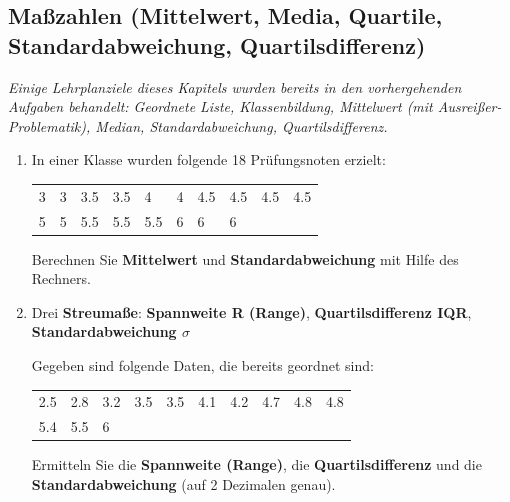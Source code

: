\subsection{Maßzahlen (Mittelwert, Media, Quartile,
  Standardabweichung, Quartilsdifferenz)}

\textit{Einige Lehrplanziele dieses Kapitels wurden bereits in den
  vorhergehenden Aufgaben behandelt: Geordnete Liste, Klassenbildung,
  Mittelwert (mit Ausreißer-Problematik), Median, Standardabweichung,
  Quartilsdifferenz.}

\begin{enumerate}
\item In einer Klasse wurden folgende 18 Prüfungsnoten erzielt:

  \begin{tabular}{llllllllll}
    3 & 3 & 3.5 & 3.5 & 4   & 4 & 4.5 & 4.5 & 4.5 & 4.5\\
    5 & 5 & 5.5 & 5.5 & 5.5 & 6 & 6   & 6
  \end{tabular}

  Berechnen Sie \textbf{Mittelwert} und \textbf{Standardabweichung}
  mit Hilfe des Rechners.

\item Drei \textbf{Streumaße}: \textbf{Spannweite R (Range)},
  \textbf{Quartilsdifferenz IQR}, \textbf{Standardabweichung $\sigma$}

  Gegeben sind folgende Daten, die bereits geordnet sind:

  \begin{tabular}{llllllllll}
    2.5 & 2.8 & 3.2 & 3.5 & 3.5 & 4.1 & 4.2 & 4.7 & 4.8 & 4.8\\
    5.4 & 5.5 & 6
  \end{tabular}

  Ermitteln Sie die \textbf{Spannweite (Range)}, die
  \textbf{Quartilsdifferenz} und die \textbf{Standardabweichung} (auf
  2 Dezimalen genau).
  
  
  \end{enumerate}
